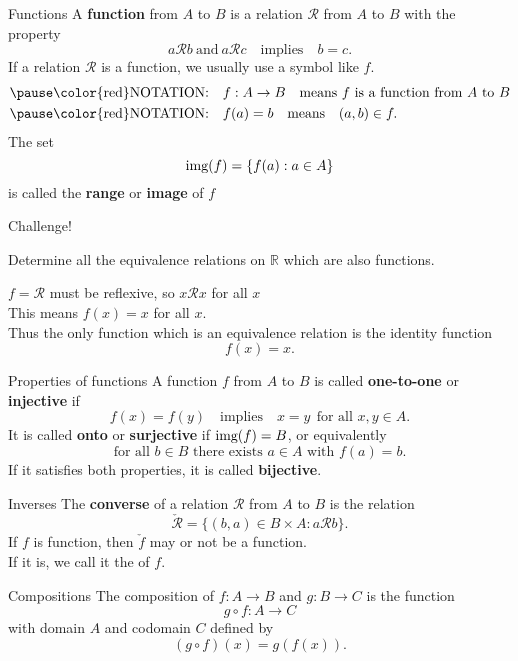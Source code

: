 \documentclass{beamer}
\begin{document}
\begin{frame}{Functions}
A \textbf{function} from $A$ to $B$ is a relation $\mathcal R$ from $A$ to $B$ with the property
\pause
$$a\mathcal Rb\ \text{and}\ a\mathcal Rc\quad\text{implies}\quad b=c.$$
\pause
If a relation $\mathcal R$ is a function, we usually use a symbol like $f$.\\
\begin{align*}
\pause
\text{\color{red}NOTATION:}&\quad f: A\rightarrow B\quad\text{means $f$ is a function from $A$ to $B$}\\
\pause
\text{\color{red}NOTATION:}&\quad f(a) = b\quad\text{means}\quad (a,b)\in f.
\end{align*}
\pause
The set $$\textnormal{img}(f) = \{f(a): a\in A\}$$ is called the \textbf{range} or \textbf{image} of $f$
\end{frame}

\begin{frame}{Challenge!}
\begin{prob}
Determine all the equivalence relations on $\mathbb{R}$ which are also functions.
\end{prob}
\pause
\begin{soln}
$f=\mathcal R$ must be reflexive, so $x\mathcal Rx$ for all $x$\\
\pause
This means $f(x) = x$ for all $x$.\\
\pause
Thus the only function which is an equivalence relation is the identity function
$$f(x) = x.$$
\end{soln}
\end{frame}

\begin{frame}{Properties of functions}
A function $f$ from $A$ to $B$ is called \textbf{one-to-one} or \textbf{injective} if 
\pause
$$f(x) = f(y) \quad\text{implies}\quad x=y\ \ \text{for all $x,y\in A$}.$$
\pause
It is called \textbf{onto} or \textbf{surjective} if $\textnormal{img}(f) = B$, or equivalently
$$\text{for all $b\in B$ there exists $a\in A$ with $f(a) =b$}.$$
\pause
If it satisfies both properties, it is called \textbf{bijective}.
\end{frame}

\begin{frame}{Inverses}
The \textbf{converse} of a relation $\mathcal R$ from $A$ to $B$ is the relation
\pause
$$\check{\mathcal R} = \{(b,a)\in B\times A: a\mathcal R b\}.$$
\pause
If $f$ is  function, then $\check f$ may or not be a function.\\
\pause
If it is, we call it the  of $f$.
\end{frame}

\begin{frame}{Compositions}
The composition of $f: A\rightarrow B$ and $g: B\rightarrow C$ is the function
\pause
$$g\circ f: A\rightarrow C$$
\pause
with domain $A$ and codomain $C$ defined by
\pause
$$(g\circ f)(x)  = g(f(x)).$$
\end{frame}
\end{document}
